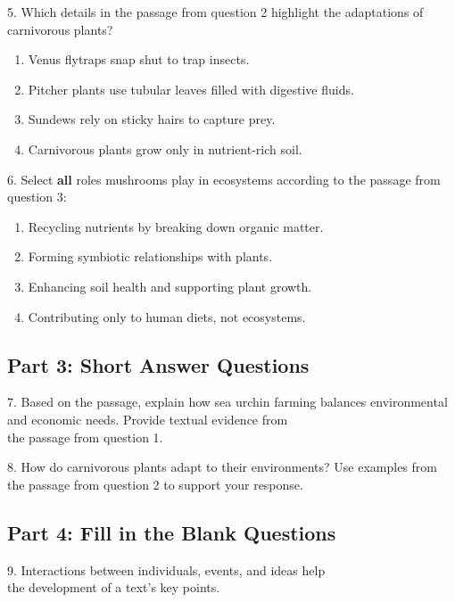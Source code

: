 \documentclass[12pt]{article}
\begin{document}
\vspace{1em}

5. Which details in the passage from question 2 highlight the adaptations of carnivorous plants?  
\begin{enumerate}[label=\Alph*.]
    \item Venus flytraps snap shut to trap insects.  
    \item Pitcher plants use tubular leaves filled with digestive fluids.  
    \item Sundews rely on sticky hairs to capture prey.  
    \item Carnivorous plants grow only in nutrient-rich soil.  
\end{enumerate}

\vspace{1cm}

6. Select \textbf{all} roles mushrooms play in ecosystems according to the passage from question 3:  
\begin{enumerate}[label=\Alph*.]
    \item Recycling nutrients by breaking down organic matter.  
    \item Forming symbiotic relationships with plants.  
    \item Enhancing soil health and supporting plant growth.  
    \item Contributing only to human diets, not ecosystems.  
\end{enumerate}



\subsection*{Part 3: Short Answer Questions}

7. Based on the passage, explain how sea urchin farming balances environmental and economic needs. Provide textual evidence from \\the passage from question 1.  
\vspace{4cm}

8. How do carnivorous plants adapt to their environments? Use examples from the passage from question 2 to support your response.  
\vspace{4cm}

\subsection*{Part 4: Fill in the Blank Questions}
\vspace{1em}
9. Interactions between individuals, events, and ideas help \underline{\hspace{4cm}} \\the development of a text’s key points.  
\vspace{2cm}
\end{document}
